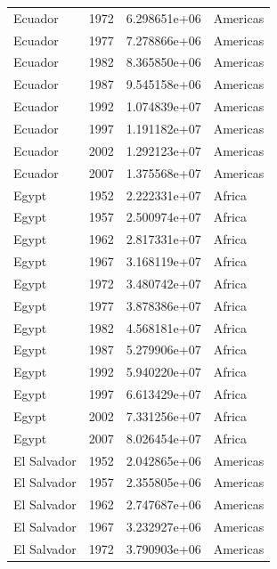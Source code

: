 \documentclass[
  letterpaper,
  DIV=11,
  numbers=noendperiod]{scrreprt}
\begin{document}
\begin{tcolorbox}
\begin{tabular}{lrrl}
Ecuador                  &  1972 &  6.298651e+06 &  Americas \\
Ecuador                  &  1977 &  7.278866e+06 &  Americas \\
Ecuador                  &  1982 &  8.365850e+06 &  Americas \\
Ecuador                  &  1987 &  9.545158e+06 &  Americas \\
Ecuador                  &  1992 &  1.074839e+07 &  Americas \\
Ecuador                  &  1997 &  1.191182e+07 &  Americas \\
Ecuador                  &  2002 &  1.292123e+07 &  Americas \\
Ecuador                  &  2007 &  1.375568e+07 &  Americas \\
Egypt                    &  1952 &  2.222331e+07 &    Africa \\
Egypt                    &  1957 &  2.500974e+07 &    Africa \\
Egypt                    &  1962 &  2.817331e+07 &    Africa \\
Egypt                    &  1967 &  3.168119e+07 &    Africa \\
Egypt                    &  1972 &  3.480742e+07 &    Africa \\
Egypt                    &  1977 &  3.878386e+07 &    Africa \\
Egypt                    &  1982 &  4.568181e+07 &    Africa \\
Egypt                    &  1987 &  5.279906e+07 &    Africa \\
Egypt                    &  1992 &  5.940220e+07 &    Africa \\
Egypt                    &  1997 &  6.613429e+07 &    Africa \\
Egypt                    &  2002 &  7.331256e+07 &    Africa \\
Egypt                    &  2007 &  8.026454e+07 &    Africa \\
El Salvador              &  1952 &  2.042865e+06 &  Americas \\
El Salvador              &  1957 &  2.355805e+06 &  Americas \\
El Salvador              &  1962 &  2.747687e+06 &  Americas \\
El Salvador              &  1967 &  3.232927e+06 &  Americas \\
El Salvador              &  1972 &  3.790903e+06 &  Americas \\

\end{tabular}
\end{tcolorbox}
\end{document}
